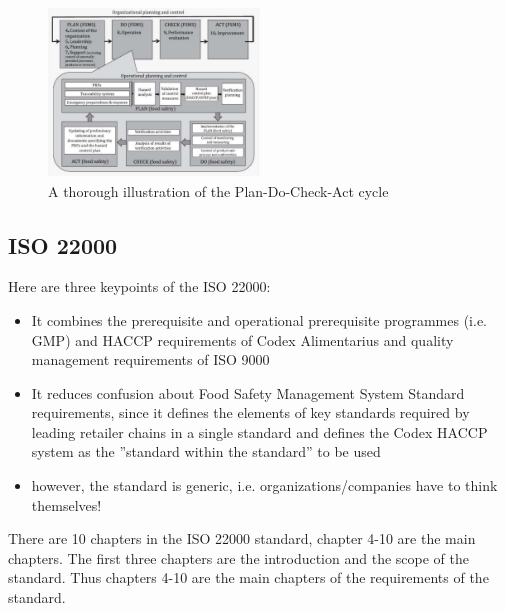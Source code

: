 \begin{figure}
    \centering
    \includegraphics[width=0.5\textwidth]{Figures/ThoroughDC.png}
    \caption{A thorough illustration of the Plan-Do-Check-Act cycle}
    \label{fig:ThoroughDC}
\end{figure}



\subsection{ISO 22000}
Here are three keypoints of the ISO 22000:

\begin{highlight}
    \begin{itemize}
        \item It combines the prerequisite and operational prerequisite
        programmes (i.e. GMP) and HACCP requirements of Codex
        Alimentarius and quality management requirements of ISO 9000
        \item It reduces confusion about Food Safety Management System
        Standard requirements, since it defines the elements of key
        standards required by leading retailer chains in a single standard
        and defines the Codex HACCP system as the ”standard within the
        standard” to be used
        \item however, the standard is generic, i.e. organizations/companies have to think themselves!
    \end{itemize}
\end{highlight}

There are 10 chapters in the ISO 22000 standard, chapter 4-10 are the main chapters. The first three chapters are the introduction and the scope of the standard. Thus chapters 4-10 are the main chapters of the requirements of the standard.

